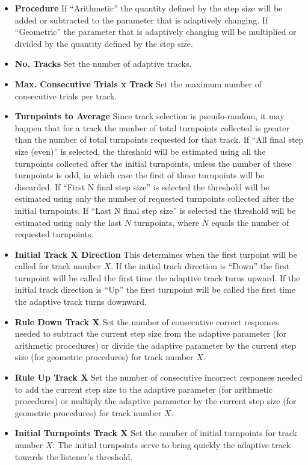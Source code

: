 \begin{itemize}
\item \textbf{Procedure} If ``Arithmetic'' the quantity defined by the step size will be added or subtracted to the parameter that is adaptively changing. 
  If ``Geometric'' the parameter that is adaptively changing will be multiplied or divided by the quantity defined by the step size.
\item \textbf{No. Tracks} Set the number of adaptive tracks.
\item \textbf{Max. Consecutive Trials x Track} Set the maximum number of consecutive trials per track. 
\item \textbf{Turnpoints to Average} Since track selection is pseudo-random, it may happen that for a track the number of total turnpoints collected is greater
  than the number of total turnpoints requested for that track. If ``All final step size (even)'' is selected, the threshold will be estimated using all
  the turnpoints collected after the initial turnpoints, unless the number of these turnpoints is odd, in which case the first of these turnpoints will be discarded.
  If ``First N final step size'' is selected the threshold will be estimated using only the number of requested turnpoints collected after the initial turnpoints.
  If ``Last N final step size'' is selected the threshold will be estimated using only the last $N$ turnpoints, where $N$ equals the number of requested turnpoints.
\item \textbf{Initial Track X Direction} This determines when the first turpoint will be called for track number $X$. If the initial track direction is ``Down'' the first turnpoint will be called
  the first time the adaptive track turns upward. If the initial track direction is ``Up'' the first turnpoint will be called
  the first time the adaptive track turns downward.
\item \textbf{Rule Down Track X} Set the number of consecutive correct responses needed to subtract the current step size from the adaptive parameter (for arithmetic procedures) or divide
  the adaptive parameter by the current step size (for geometric procedures) for track number $X$.
\item \textbf{Rule Up Track X} Set the number of consecutive incorrect responses needed to add the current step size to the adaptive parameter (for arithmetic procedures) 
  or multiply the adaptive parameter by the current step size (for geometric procedures) for track number $X$.
\item \textbf{Initial Turnpoints Track X} Set the number of initial turnpoints for track number $X$. The initial turnpoints serve to bring quickly the adaptive track towards the listener's threshold.

\end{itemize}
